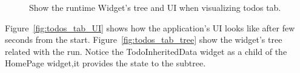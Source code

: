 \begin{figure}[H]
    \centering
    \quad
    \caption{Show the runtime Widget's tree and UI when visualizing todos tab.}
    \label{fig:todos_tab}
\end{figure}


Figure~\ref{fig:todos_tab_UI} shows how the application's UI looks like after few seconds from the start. Figure~\ref{fig:todos_tab_tree} show the widget's tree related with the run. Notice the TodoInheritedData widget as a child of the HomePage widget,it provides the state to the subtree.
